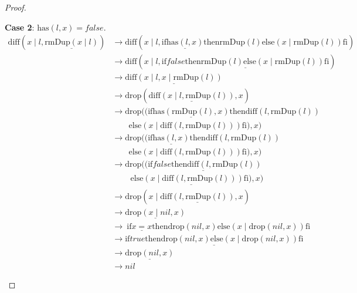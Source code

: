\documentclass[12pt, a4paper]{article}
\newcommand{\rel}[1]{\mathrel{#1}}
\newcommand{\rmx}[1]{\mathrm{#1}}
\newcommand{\larrow}{\longrightarrow}
\newcommand{\under}{\underline}
\begin{document}
\begin{proof}
\begin{description}
\textbf{Case 2}: $\rmx{has}(l, x) = false$.
\begin{align*}
\rmx{diff}(x \mid l, \under{\rmx{rmDup}(x \mid l)})
	&\larrow \rmx{diff}(x \mid l, \rel{\rmx{if}} \under{\rmx{has}(l, x)} \rel{\rmx{then}} \rmx{rmDup}(l) \rel{\rmx{else}} (x \mid \rmx{rmDup}(l)) \rel{\rmx{fi}}) \tag{by rmDup2} \\
	&\larrow \rmx{diff}(x \mid l, \under{\rel{\rmx{if}} false \rel{\rmx{then}} \rmx{rmDup}(l) \rel{\rmx{else}} (x \mid \rmx{rmDup}(l)) \rel{\rmx{fi}}}) \tag{by case splitting} \\	
	&\larrow \under{\rmx{diff}(x \mid l, x \mid \rmx{rmDup}(l))} \tag{by if2} \\	
	&\larrow \rmx{drop}(\under{\rmx{diff}(x \mid l, \rmx{rmDup}(l))}, x) \tag{by Problem 14} \\	
	&\larrow \rmx{drop}((\rel{\rmx{if}} \under{\rmx{has}(\rmx{rmDup}(l), x)} \rel{\rmx{then}} \rmx{diff}(l, \rmx{rmDup}(l)) \\
	&\quad \quad \rel{\rmx{else}} ( x \mid \rmx{diff}(l, \rmx{rmDup}(l))) \rel{\rmx{fi}}), x) \tag{by diff2} \\	
	&\larrow \rmx{drop}((\rel{\rmx{if}} \under{\rmx{has}(l, x)} \rel{\rmx{then}} \rmx{diff}(l, \rmx{rmDup}(l)) \\
	&\quad \quad \rel{\rmx{else}} ( x \mid \rmx{diff}(l, \rmx{rmDup}(l))) \rel{\rmx{fi}}), x) \tag{by Problem 17 - Lemma 1} \\	
	&\larrow \rmx{drop}(\under{(\rel{\rmx{if}} false \rel{\rmx{then}} \rmx{diff}(l, \rmx{rmDup}(l))} \\
	&\quad \quad\ \under{\rel{\rmx{else}} ( x \mid \rmx{diff}(l, \rmx{rmDup}(l))) \rel{\rmx{fi}})}, x) \tag{by case splitting} \\
	&\larrow \rmx{drop}(x \mid \under{\rmx{diff}(l, \rmx{rmDup}(l))}, x) \tag{by if2} \\
	&\larrow \under{\rmx{drop}(x \mid nil, x)} \tag{by IH} \\
	&\larrow\ \rel{\rmx{if}} \under{x = x} \rel{\rmx{then}} \rmx{drop}(nil, x) \rel{\rmx{else}} (x \mid \rmx{drop}(nil, x)) \rel{\rmx{fi}} \tag{by drop2} \\
	&\larrow \under{\rel{\rmx{if}} true \rel{\rmx{then}} \rmx{drop}(nil, x) \rel{\rmx{else}} (x \mid \rmx{drop}(nil, x)) \rel{\rmx{fi}}} \tag{by equality} \\
	&\larrow \under{\rmx{drop}(nil, x)} \tag{by if1} \\
	&\larrow nil \tag{by drop1}
\end{align*}
\end{description}
\end{proof}
\end{document}
